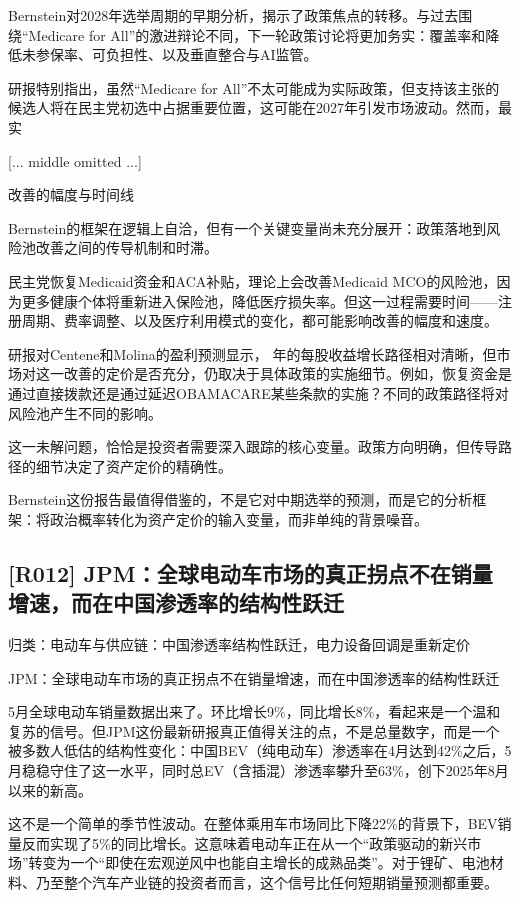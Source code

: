 \documentclass[11pt]{ctexart}
\begin{document}
Bernstein对2028年选举周期的早期分析，揭示了政策焦点的转移。与过去围绕“Medicare for All”的激进辩论不同，下一轮政策讨论将更加务实：覆盖率和降低未参保率、可负担性、以及垂直整合与AI监管。

研报特别指出，虽然“Medicare for All”不太可能成为实际政策，但支持该主张的候选人将在民主党初选中占据重要位置，这可能在2027年引发市场波动。然而，最实

[... middle omitted ...]

改善的幅度与时间线

Bernstein的框架在逻辑上自洽，但有一个关键变量尚未充分展开：政策落地到风险池改善之间的传导机制和时滞。

民主党恢复Medicaid资金和ACA补贴，理论上会改善Medicaid MCO的风险池，因为更多健康个体将重新进入保险池，降低医疗损失率。但这一过程需要时间——注册周期、费率调整、以及医疗利用模式的变化，都可能影响改善的幅度和速度。

研报对Centene和Molina的盈利预测显示， 年的每股收益增长路径相对清晰，但市场对这一改善的定价是否充分，仍取决于具体政策的实施细节。例如，恢复资金是通过直接拨款还是通过延迟OBAMACARE某些条款的实施？不同的政策路径将对风险池产生不同的影响。

这一未解问题，恰恰是投资者需要深入跟踪的核心变量。政策方向明确，但传导路径的细节决定了资产定价的精确性。

Bernstein这份报告最值得借鉴的，不是它对中期选举的预测，而是它的分析框架：将政治概率转化为资产定价的输入变量，而非单纯的背景噪音。

\subsection{[R012] JPM：全球电动车市场的真正拐点不在销量增速，而在中国渗透率的结构性跃迁}
{\small\color{refgray}归类：电动车与供应链：中国渗透率结构性跃迁，电力设备回调是重新定价}

JPM：全球电动车市场的真正拐点不在销量增速，而在中国渗透率的结构性跃迁

5月全球电动车销量数据出来了。环比增长9\%，同比增长8\%，看起来是一个温和复苏的信号。但JPM这份最新研报真正值得关注的点，不是总量数字，而是一个被多数人低估的结构性变化：中国BEV（纯电动车）渗透率在4月达到42\%之后，5月稳稳守住了这一水平，同时总EV（含插混）渗透率攀升至63\%，创下2025年8月以来的新高。

这不是一个简单的季节性波动。在整体乘用车市场同比下降22\%的背景下，BEV销量反而实现了5\%的同比增长。这意味着电动车正在从一个“政策驱动的新兴市场”转变为一个“即使在宏观逆风中也能自主增长的成熟品类”。对于锂矿、电池材料、乃至整个汽车产业链的投资者而言，这个信号比任何短期销量预测都重要。
\end{document}
